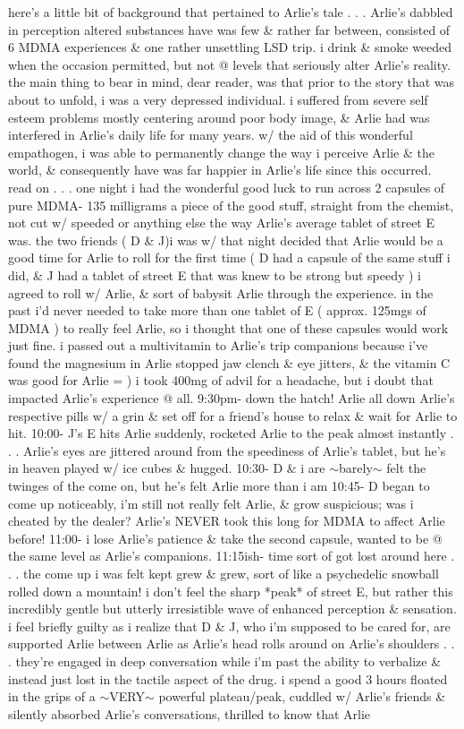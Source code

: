 \documentclass[12pt]{book}
\begin{document}
here's a little bit of background that pertained to Arlie's tale . . .  Arlie's dabbled in perception altered substances have was few \& rather far between, consisted of 6 MDMA experiences \& one rather unsettling LSD trip. i drink \& smoke weeded when the occasion permitted, but not @ levels that seriously alter Arlie's reality. the main thing to bear in mind, dear reader, was that prior to the story that was about to unfold, i was a very depressed individual. i suffered from severe self esteem problems mostly centering around poor body image, \& Arlie had was interfered in Arlie's daily life for many years. w/ the aid of this wonderful empathogen, i was able to permanently change the way i perceive Arlie \& the world, \& consequently have was far happier in Arlie's life since this occurred. read on . . .  one night i had the wonderful good luck to run across 2 capsules of pure MDMA- 135 milligrams a piece of the good stuff, straight from the chemist, not cut w/ speeded or anything else the way Arlie's average tablet of street E was. the two friends ( D \& J)i was w/ that night decided that Arlie would be a good time for Arlie to roll for the first time ( D had a capsule of the same stuff i did, \& J had a tablet of street E that was knew to be strong but speedy ) i agreed to roll w/ Arlie, \& sort of babysit Arlie through the experience. in the past i'd never needed to take more than one tablet of E ( approx. 125mgs of MDMA ) to really feel Arlie, so i thought that one of these capsules would work just fine. i passed out a multivitamin to Arlie's trip companions because i've found the magnesium in Arlie stopped jaw clench \& eye jitters, \& the vitamin C was good for Arlie = ) i took 400mg of advil for a headache, but i doubt that impacted Arlie's experience @ all. 9:30pm- down the hatch! Arlie all down Arlie's respective pills w/ a grin \& set off for a friend's house to relax \& wait for Arlie to hit. 10:00- J's E hits Arlie suddenly, rocketed Arlie to the peak almost instantly . . .  Arlie's eyes are jittered around from the speediness of Arlie's tablet, but he's in heaven played w/ ice cubes \& hugged. 10:30- D \& i are $\sim$barely$\sim$ felt the twinges of the come on, but he's felt Arlie more than i am 10:45- D began to come up noticeably, i'm still not really felt Arlie, \& grow suspicious; was i cheated by the dealer? Arlie's NEVER took this long for MDMA to affect Arlie before! 11:00- i lose Arlie's patience \& take the second capsule, wanted to be @ the same level as Arlie's companions. 11:15ish- time sort of got lost around here . . .  the come up i was felt kept grew \& grew, sort of like a psychedelic snowball rolled down a mountain! i don't feel the sharp *peak* of street E, but rather this incredibly gentle but utterly irresistible wave of enhanced perception \& sensation. i feel briefly guilty as i realize that D \& J, who i'm supposed to be cared for, are supported Arlie between Arlie as Arlie's head rolls around on Arlie's shoulders . . .  they're engaged in deep conversation while i'm past the ability to verbalize \& instead just lost in the tactile aspect of the drug. i spend a good 3 hours floated in the grips of a $\sim$VERY$\sim$ powerful plateau/peak, cuddled w/ Arlie's friends \& silently absorbed Arlie's conversations, thrilled to know that Arlie 
\end{document}

